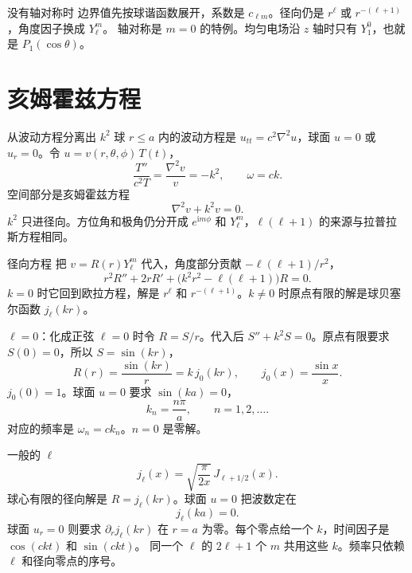 \documentclass[fontset=windows, chinese, 10pt, xcolor=dvipsnames]{beamer}
\begin{document}
\begin{frame}{没有轴对称时}
  边界值先按球谐函数展开，系数是 $c_{\ell m}$。径向仍是 $r^{\ell}$ 或 $r^{-(\ell+1)}$，角度因子换成 $Y_{\ell}^{m}$。
  \vspace{0.4em}
  轴对称是 $m=0$ 的特例。均匀电场沿 $z$ 轴时只有 $Y_1^{0}$，也就是 $P_1(\cos\theta)$。
\end{frame}

\section{亥姆霍兹方程}

\begin{frame}{从波动方程分离出 $k^2$}
  球 $r\leq a$ 内的波动方程是 $u_{tt}=c^2\nabla^2 u$，球面 $u=0$ 或 $u_r=0$。令 $u=v(r,\theta,\phi)\,T(t)$，
  \[
    \frac{T''}{c^2 T}=\frac{\nabla^2 v}{v}=-k^2,
    \qquad \omega=ck.
  \]
  空间部分是亥姆霍兹方程
  \begin{equation*}
    \boxed{\displaystyle \nabla^2 v+k^2 v=0.}
  \end{equation*}
  $k^2$ 只进径向。方位角和极角仍分开成 $e^{\mathrm{i}m\phi}$ 和 $Y_{\ell}^{m}$，$\ell(\ell+1)$ 的来源与拉普拉斯方程相同。
\end{frame}

\begin{frame}{径向方程}
  把 $v=R(r)Y_{\ell}^{m}$ 代入，角度部分贡献 $-\ell(\ell+1)/r^2$，
  \begin{equation*}
    \boxed{\displaystyle
      r^2 R''+2r R'+\bigl(k^2 r^2-\ell(\ell+1)\bigr)R=0.}
  \end{equation*}
  $k=0$ 时它回到欧拉方程，解是 $r^{\ell}$ 和 $r^{-(\ell+1)}$。$k\neq 0$ 时原点有限的解是球贝塞尔函数 $j_{\ell}(kr)$。
\end{frame}

\begin{frame}{$\ell=0$：化成正弦}
  $\ell=0$ 时令 $R=S/r$。代入后 $S''+k^2 S=0$。原点有限要求 $S(0)=0$，所以 $S=\sin(kr)$，
  \[
    R(r)=\frac{\sin(kr)}{r}=k\,j_0(kr),
    \qquad
    j_0(x)=\frac{\sin x}{x}.
  \]
  $j_0(0)=1$。球面 $u=0$ 要求 $\sin(ka)=0$，
  \[
    k_n=\frac{n\pi}{a},
    \qquad n=1,2,\ldots.
  \]
  对应的频率是 $\omega_n=c k_n$。$n=0$ 是零解。
\end{frame}

\begin{frame}{一般的 $\ell$}
  \[
    j_{\ell}(x)=\sqrt{\frac{\pi}{2x}}\,J_{\ell+1/2}(x).
  \]
  球心有限的径向解是 $R=j_{\ell}(kr)$。球面 $u=0$ 把波数定在
  \[
    j_{\ell}(k a)=0.
  \]
  球面 $u_r=0$ 则要求 $\partial_r j_{\ell}(kr)$ 在 $r=a$ 为零。每个零点给一个 $k$，时间因子是 $\cos(ckt)$ 和 $\sin(ckt)$。
  \vspace{0.35em}
  同一个 $\ell$ 的 $2\ell+1$ 个 $m$ 共用这些 $k$。频率只依赖 $\ell$ 和径向零点的序号。
\end{frame}
\end{document}
